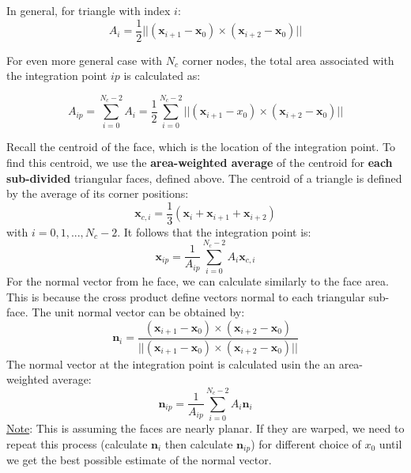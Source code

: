 \documentclass[11pt]{article}
\begin{document}
In general, for triangle with index \(i\):
\begin{equation*}
A_i = \frac{1}{2} || (\textbf{x}_{i+1} - \textbf{x}_0) \times (\textbf{x}_{i+2} - \textbf{x}_0) ||
\end{equation*}

For even more general case with \(N_c\) corner nodes, the total area associated with the integration point
\(ip\) is calculated as:

\begin{equation*}
A_{ip} = \sum_{i=0}^{N_c - 2} A_i = \frac{1}{2}\sum_{i=0}^{N_c - 2} || (\textbf{x}_{i+1}-x_0) \times
(\textbf{x}_{i+2} - \textbf{x}_0) ||
\end{equation*}

Recall the centroid of the face, which is the location of the integration point.  To find this centroid, we
use the \textbf{area-weighted average} of the centroid for \textbf{each sub-divided} triangular faces, defined above.
The centroid of a triangle is defined by the average of its corner positions:
\begin{equation*}
\textbf{x}_{c,i} = \frac{1}{3}(\textbf{x}_i + \textbf{x}_{i+1} + \textbf{x}_{i+2})
\end{equation*}
with \(i = 0,1,..., N_{c}-2\). It follows that the integration point is:
\begin{equation*}
\textbf{x}_{ip} = \frac{1}{A_{ip}}\sum_{i=0}^{N_c - 2} A_i \textbf{x}_{c,i}
\end{equation*}
For the normal vector from he face, we can calculate similarly to the face area. This is because the cross
product define vectors normal to each triangular sub-face. The unit normal vector can be obtained by:
\begin{equation*}
\textbf{n}_i = \frac{(\textbf{x}_{i+1}-\textbf{x}_0) \times (\textbf{x}_{i+2}-\textbf{x}_0) }
{||(\textbf{x}_{i+1}-\textbf{x}_0) \times (\textbf{x}_{i+2}-\textbf{x}_0) || }
\end{equation*}
The normal vector at the integration point is calculated usin the an area-weighted average:
\begin{equation*}
\textbf{n}_{ip} = \frac{1}{A_{ip}}\sum_{i=0}^{N_c -2}A_i \textbf{n}_i
\end{equation*}
\uline{Note}: This is assuming the faces are nearly planar.  If they are warped, we need to repeat this process
(calculate \(\textbf{n}_i\) then calculate \(\textbf{n}_{ip}\)) for different choice of \(x_0\) until we get
the best possible estimate of the normal vector.
\end{document}
